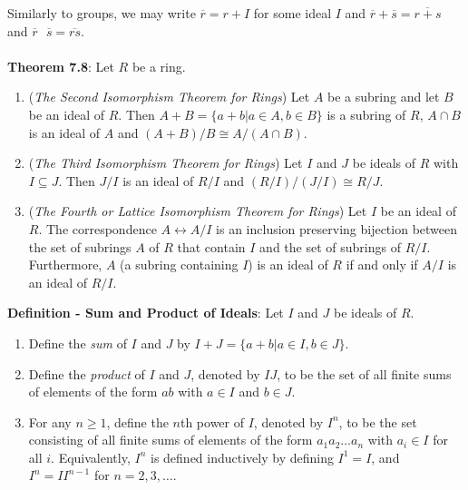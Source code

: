 \documentclass{article}
\begin{document}
Similarly to groups, we may write $\overline{r} = r + I$ for some ideal $I$ and $\overline{r} + \overline{s} = \overline{r + s}$ and $\overline{r} \text{ } \overline{s} = \overline{rs}$. \\ \\
\textbf{Theorem 7.8}: Let $R$ be a ring. \begin{enumerate}
    \item (\textit{The Second Isomorphism Theorem for Rings}) Let $A$ be a subring and let $B$ be an ideal of $R$. Then $A + B = \{a + b | a \in A, b \in B\}$ is a subring of $R$, $A \cap B$ is an ideal of $A$ and $(A + B)/ B \cong A / (A \cap B)$. 
    \item (\textit{The Third Isomorphism Theorem for Rings}) Let $I$ and $J$ be ideals of $R$ with $I \subseteq J$. Then $J/I$ is an ideal of $R/I$ and $(R/I) / (J/I) \cong R / J$.
    \item (\textit{The Fourth or Lattice Isomorphism Theorem for Rings}) Let $I$ be an ideal of $R$. The correspondence $A \leftrightarrow A/I$ is an inclusion preserving bijection between the set of subrings $A$ of $R$ that contain $I$ and the set of subrings of $R / I$. Furthermore, $A$ (a subring containing $I$) is an ideal of $R$ if and only if $A/I$ is an ideal of $R / I$.
\end{enumerate} $ $ \\
\textbf{Definition - Sum and Product of Ideals}: Let $I$ and $J$ be ideals of $R$. \begin{enumerate}
    \item Define the \textit{sum} of $I$ and $J$ by $I + J = \{a + b | a \in I, b \in J\}$.
    \item Define the \textit{product} of $I$ and $J$, denoted by $IJ$, to be the set of all finite sums of elements of the form $ab$ with $a \in I$ and $b \in J.$ 
    \item For any $n \geq 1$, define the $n$th power of $I$, denoted by $I^n$, to be the set consisting of all finite sums of elements of the form $a_1 a_2 \dots a_n$ with $a_i \in I$ for all $i$. Equivalently, $I^n$ is defined inductively by defining $I^1 = I$, and $I^n = I I^{n - 1}$ for $n = 2, 3, \dots.$
\end{enumerate} $ $ \\
\end{document}
